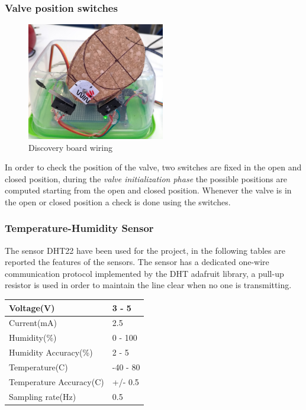 	\subsubsection{Valve position switches}
\begin{figure}[h]
	\centering
	\includegraphics[width=6cm,keepaspectratio]{img/valve}
	\caption{Discovery board wiring}
	\label{fig:valve}
\end{figure}
In order to check the position of the valve, two switches are fixed in the open and closed position, during the \textit{valve initialization phase} the possible positions are computed starting from the open and closed position.
Whenever the valve is in the open or closed position a check is done using the switches.

\subsubsection{Temperature-Humidity Sensor}
The sensor DHT22 have been used for the project, in the following tables are reported the features of the sensors.
The sensor has a dedicated one-wire communication protocol implemented by the DHT adafruit library, a pull-up resistor is used in order to maintain the line clear when no one is transmitting.

\begin{center}
	\begin{tabular}{||l | l||} 
		\hline
		Voltage(V) & 3 - 5 \\ 
		\hline
		Current(mA) & 2.5 \\
		\hline
		Humidity(\%) & 0 - 100 \\
		\hline
		Humidity Accuracy(\%) & 2 - 5 \\
		\hline
		Temperature(C\degree) & -40 - 80 \\
		\hline
		Temperature Accuracy(C\degree) & +/- 0.5 \\
		\hline
		Sampling rate(Hz) & 0.5 \\
		\hline
	\end{tabular}
\end{center}


